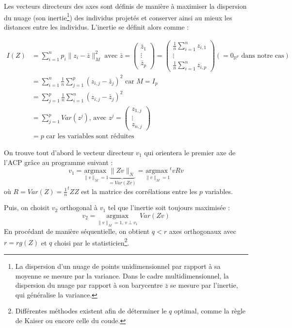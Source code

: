 \documentclass[11pt,french,french]{article}
\let\rmarkdownfootnote\footnote%
\def\footnote{\protect\rmarkdownfootnote}
\begin{document}
Les vecteurs directeurs des axes sont définis de manière à maximiser la dispersion du nuage (son inertie\footnote{La dispersion d'un nuage de points unidimensionnel par rapport à sa moyenne se mesure par la variance.
  Dans le cadre multidimensionnel, la dispersion du nuage par rapport à son barycentre \(\bar z\) se mesure par l'inertie, qui généralise la variance.}) des individus projetés et conserver ainsi au mieux les distances entre les individus. L'inertie se définit alors comme :

\begin{align*}
I(Z) &= \sum_{i = 1}^n p_i\|z_i-\bar{z}\|_M^2 \text{ avec }
  \bar{z} = 
  \begin{pmatrix}\bar z_{1} \\
    \vdots \\ \bar z_{p}
  \end{pmatrix} =
  \begin{pmatrix}\frac 1 n \sum_{i=1}^n z_{i,1} \\
    \vdots \\ \frac 1 n \sum_{i=1}^n z_{i,p}
  \end{pmatrix} (= 0_{\mathbb R^p}\text{ dans notre cas})
\\&=\sum_{i = 1}^n \frac 1 n \sum_{j=1}^p (z_{i,j} -  \bar{z}_j)^2  \text{ car }M=I_p 
\\&=\sum_{j = 1}^p \frac 1 n \sum_{i=1}^n (z_{i,j} -  \bar{z}_j)^2
\\&=\sum_{j = 1}^p Var(z^j)\text{, avec } z^j = 
  \begin{pmatrix} z_{1,j} \\ \vdots \\  z_{n,j} 
  \end{pmatrix}
\\ &= p \text{ car les variables sont réduites}
\end{align*}

On trouve tout d'abord le vecteur directeur \(v_1\) qui orientera le premier axe de l'ACP grâce au programme suivant :
\[
v_1 =\underset{\| v \|_M = 1}{\mathrm{argmax~}} 
\underbrace{\|Zv\|_N}_{=Var(Zv)} =\underset{\| v \|_M = 1}{\mathrm{argmax~}} ^t\!vR v 
\]
où \(R = Var(Z) = \frac{1}{n} ^t\!Z Z\) est la matrice des corrélations entre les \(p\) variables.

Puis, on choisit \(v_2\) orthogonal à \(v_1\) tel que l'inertie soit toujours maximisée :
\[
v_2 =\underset{ \| v \|_M = 1,\,v \perp v_1}{\mathrm{argmax}}\;  Var(Zv)
\]
En procédant de manière séquentielle, on obtient \(q < r\) axes orthogonaux avec \(r = rg(Z)\) et \(q\) choisi par le statisticien\footnote{Différentes méthodes existent afin de déterminer le \(q\) optimal, comme la règle de Kaiser ou encore celle du coude.}.
\end{document}
